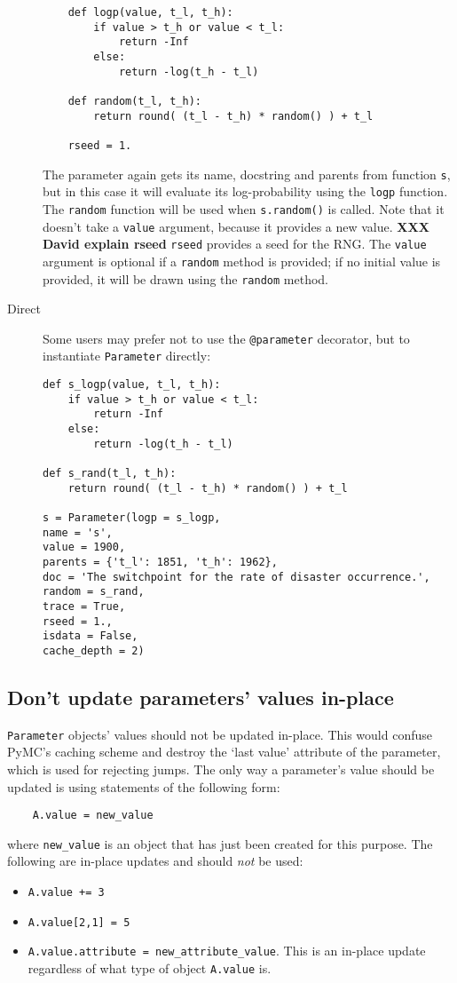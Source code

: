 \begin{description}
\begin{verbatim}
    def logp(value, t_l, t_h):
        if value > t_h or value < t_l:
            return -Inf
        else:
            return -log(t_h - t_l) 
            
    def random(t_l, t_h):
        return round( (t_l - t_h) * random() ) + t_l

    rseed = 1.
    \end{verbatim}
The parameter again gets its name, docstring and parents from function \texttt{s}, but in this case it will evaluate its log-probability using the \texttt{logp} function. The \texttt{random} function will be used when \texttt{s.random()} is called. Note that it doesn't take a \texttt{value} argument, because it provides a new value. \textbf{XXX David explain rseed} \texttt{rseed} provides a seed for the RNG. The \texttt{value} argument is optional if a \texttt{random} method is provided; if no initial value is provided, it will be drawn using the \texttt{random} method.

    \item[Direct] Some users may prefer not to use the \texttt{@parameter} decorator, but to instantiate \texttt{Parameter} directly:
\begin{verbatim}
def s_logp(value, t_l, t_h):
    if value > t_h or value < t_l:
        return -Inf
    else:
        return -log(t_h - t_l) 

def s_rand(t_l, t_h):
    return round( (t_l - t_h) * random() ) + t_l

s = Parameter(logp = s_logp, 
name = 's', 
value = 1900,
parents = {'t_l': 1851, 't_h': 1962},
doc = 'The switchpoint for the rate of disaster occurrence.',
random = s_rand, 
trace = True, 
rseed = 1., 
isdata = False,
cache_depth = 2)
\end{verbatim}
\end{description}

\subsection{Don't update parameters' values in-place}\label{sub:warning}

\texttt{Parameter} objects' values should not be updated in-place. This would confuse PyMC's caching scheme and destroy the `last value' attribute of the parameter, which is used for rejecting jumps. The only way a parameter's value should be updated is using statements of the following form:
\begin{verbatim}
    A.value = new_value
\end{verbatim}
where \texttt{new\_value} is an object that has just been created for this purpose. The following are in-place updates and should \emph{not} be used:
\begin{itemize}
    \item \texttt{A.value += 3}
    \item \texttt{A.value[2,1] = 5}
    \item \texttt{A.value.attribute = new_attribute_value}. This is an in-place update regardless of what type of object \texttt{A.value} is.
\end{itemize}

